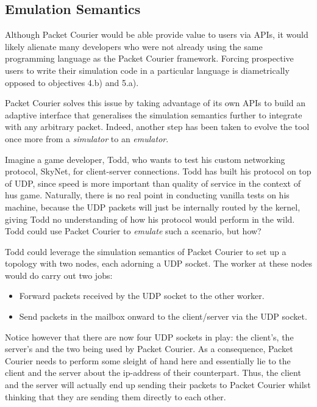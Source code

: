 \subsection{Emulation Semantics}

Although Packet Courier would be able provide value to users via APIs, it would likely alienate many developers who
were not already using the same programming language as the Packet Courier framework. Forcing prospective users to
write their simulation code in a particular language is diametrically opposed to objectives 4.b) and 5.a).

Packet Courier solves this issue by taking advantage of its own APIs to build an adaptive interface that generalises
the simulation semantics further to integrate with any arbitrary packet. Indeed, another step has been taken to
evolve the tool once more from a \emph{simulator} to an \emph{emulator}.

Imagine a game developer, Todd, who wants to test his custom networking protocol, SkyNet, for client-server
connections. Todd has built his protocol on top of UDP, since speed is more important than quality of service in the
context of hus game. Naturally, there is no real point in conducting vanilla tests on his machine, because the UDP
packets will just be internally routed by the kernel, giving Todd no understanding of how his protocol would perform
in the wild. Todd could use Packet Courier to \emph{emulate} such a scenario, but how?

Todd could leverage the simulation semantics of Packet Courier to set up a topology with two nodes, each adorning a UDP
socket. The worker at these nodes would do carry out two jobs:
\begin{itemize}
    \item Forward packets received by the UDP socket to the other worker.
    \item Send packets in the mailbox onward to the client/server via the UDP socket.
\end{itemize}

Notice however that there are now four UDP sockets in play: the client's, the server's and the two being used by
Packet Courier. As a consequence, Packet Courier needs to perform some sleight of hand here and essentially lie to
the client and the server about the ip-address of their counterpart. Thus, the client and the server will actually
end up sending their packets to Packet Courier whilst thinking that they are sending them directly to each other.


